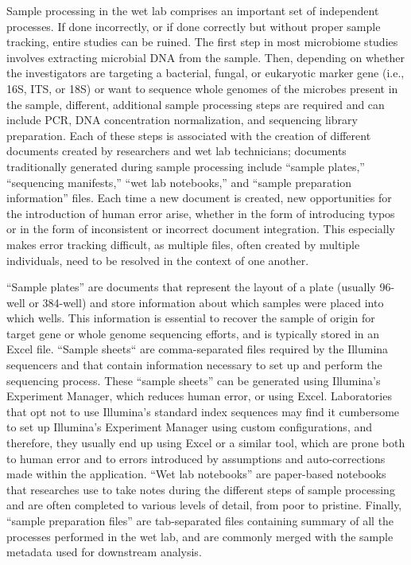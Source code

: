 Sample processing in the wet lab comprises an important set of independent
processes. If done incorrectly, or if done correctly but without proper sample
tracking, entire studies can be ruined. The first step in most microbiome
studies involves extracting microbial DNA from the sample. Then, depending on
whether the investigators are targeting a bacterial, fungal, or eukaryotic marker
gene (i.e., 16S, ITS, or 18S) or want to sequence whole genomes of the microbes
present in the sample, different, additional sample processing steps are required
and can include PCR, DNA concentration normalization, and sequencing library
preparation. Each of these steps is associated with the creation of different
documents created by researchers and wet lab technicians; documents traditionally
generated during sample processing include “sample plates,” “sequencing manifests,”
“wet lab notebooks,” and “sample preparation information” files. Each time a new
document is created, new opportunities for the introduction of human error arise,
whether in the form of introducing typos or in the form of inconsistent or
incorrect document integration. This especially makes error tracking difficult,
as multiple files, often created by multiple individuals, need to be resolved in
the context of one another.

“Sample plates” are documents that represent the layout of a plate (usually
96-well or 384-well) and store information about which samples were placed into
which wells. This information is essential to recover the sample of origin for
target gene or whole genome sequencing efforts, and is typically stored in an Excel
file. “Sample sheets“ are comma-separated files required by the Illumina sequencers
and that contain information necessary to set up and perform the sequencing process.
These “sample sheets” can be generated using Illumina’s Experiment Manager, which
reduces human error, or using Excel. Laboratories that opt not to use Illumina’s
standard index sequences may find it cumbersome to set up Illumina’s Experiment
Manager using custom configurations, and therefore, they usually end up using
Excel or a similar tool, which are prone both to human error and to errors
introduced by assumptions and auto-corrections made within the application.
“Wet lab notebooks” are paper-based notebooks that researches use to take notes
during the different steps of sample processing and are often completed to
various levels of detail, from poor to pristine. Finally, “sample preparation
files” are tab-separated files containing summary of all the processes performed
in the wet lab, and are commonly merged with the sample metadata used for
downstream analysis.

